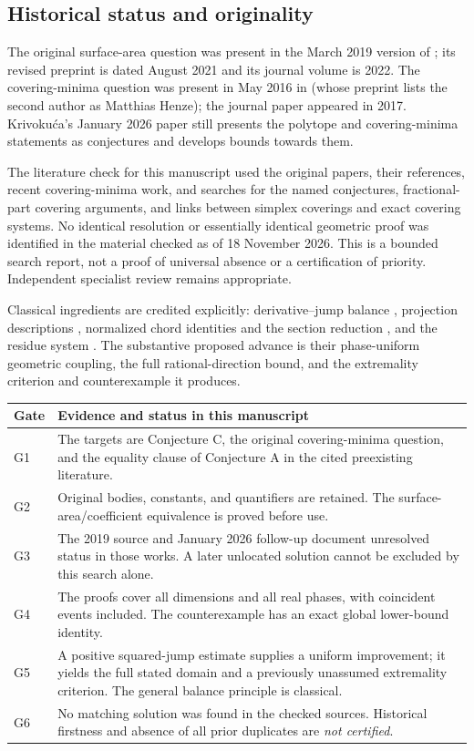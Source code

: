 \documentclass[11pt,a4paper]{article}
\theoremstyle{definition}\newtheorem{definition}[theorem]{Definition}
\theoremstyle{remark}\newtheorem{remark}[theorem]{Remark}
\begin{document}
\subsection{Historical status and originality}
The original surface-area question was present in the March 2019
version of \cite{CSS}; its revised preprint is dated August 2021
and its journal volume is 2022. The covering-minima question was
present in May 2016 in \cite{GMS} (whose preprint lists the second
author as Matthias Henze); the journal paper appeared in 2017.
Krivoku\'ca's January 2026 paper \cite{Krivokuca} still presents
the polytope and covering-minima statements as conjectures and
develops bounds towards them.

The literature check for this manuscript used the original papers,
their references, recent covering-minima work, and searches for the
named conjectures, fractional-part covering arguments, and links
between simplex coverings and exact covering systems. No identical
resolution or essentially identical geometric proof was identified
in the material checked as of 18 November 2026. This is a bounded
search report, not a proof of universal absence or a certification
of priority. Independent specialist review remains appropriate.

Classical ingredients are credited explicitly: derivative--jump
balance \cite{Miyazawa}, projection descriptions \cite{KL},
normalized chord identities and the section reduction \cite{CSS},
and the residue system \cite{Schnabel}. The substantive proposed
advance is their phase-uniform geometric coupling, the full
rational-direction bound, and the extremality criterion and
counterexample it produces.

\begin{center}
\small
\begin{tabular}{@{}p{}p{}@{}}
\toprule
Gate & Evidence and status in this manuscript\\
\midrule
G1 & The targets are Conjecture C, the original covering-minima
question, and the equality clause of Conjecture A in the cited
preexisting literature.\\[3pt]
G2 & Original bodies, constants, and quantifiers are retained.
The surface-area/coefficient equivalence is proved before use.\\[3pt]
G3 & The 2019 source and January 2026 follow-up document unresolved
status in those works. A later unlocated solution cannot be excluded
by this search alone.\\[3pt]
G4 & The proofs cover all dimensions and all real phases, with
coincident events included. The counterexample has an exact global
lower-bound identity.\\[3pt]
G5 & A positive squared-jump estimate supplies a uniform improvement;
it yields the full stated domain and a previously unassumed
extremality criterion. The general balance principle is classical.\\[3pt]
G6 & No matching solution was found in the checked sources.
Historical firstness and absence of all prior duplicates are
\emph{not certified}.\\
\bottomrule
\end{tabular}
\end{center}
\end{document}

